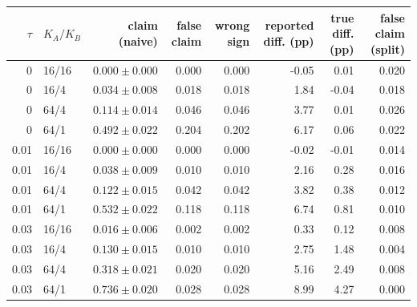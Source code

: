 {\footnotesize\setlength{\tabcolsep}{3.5pt}
\begin{tabular}{rlrrrrrr}
\toprule
$\tau$ & $K_A/K_B$ & claim (naive) & false claim & wrong sign & reported diff. (pp) & true diff. (pp) & false claim (split) \\
\midrule
0 & 16/16 & $0.000 \pm 0.000$ & 0.000 & 0.000 & -0.05 & 0.01 & 0.020 \\
0 & 16/4 & $0.034 \pm 0.008$ & 0.018 & 0.018 & 1.84 & -0.04 & 0.018 \\
0 & 64/4 & $0.114 \pm 0.014$ & 0.046 & 0.046 & 3.77 & 0.01 & 0.026 \\
0 & 64/1 & $0.492 \pm 0.022$ & 0.204 & 0.202 & 6.17 & 0.06 & 0.022 \\
\midrule
0.01 & 16/16 & $0.000 \pm 0.000$ & 0.000 & 0.000 & -0.02 & -0.01 & 0.014 \\
0.01 & 16/4 & $0.038 \pm 0.009$ & 0.010 & 0.010 & 2.16 & 0.28 & 0.016 \\
0.01 & 64/4 & $0.122 \pm 0.015$ & 0.042 & 0.042 & 3.82 & 0.38 & 0.012 \\
0.01 & 64/1 & $0.532 \pm 0.022$ & 0.118 & 0.118 & 6.74 & 0.81 & 0.010 \\
\midrule
0.03 & 16/16 & $0.016 \pm 0.006$ & 0.002 & 0.002 & 0.33 & 0.12 & 0.008 \\
0.03 & 16/4 & $0.130 \pm 0.015$ & 0.010 & 0.010 & 2.75 & 1.48 & 0.004 \\
0.03 & 64/4 & $0.318 \pm 0.021$ & 0.020 & 0.020 & 5.16 & 2.49 & 0.008 \\
0.03 & 64/1 & $0.736 \pm 0.020$ & 0.028 & 0.028 & 8.99 & 4.27 & 0.000 \\
\bottomrule
\end{tabular}}
